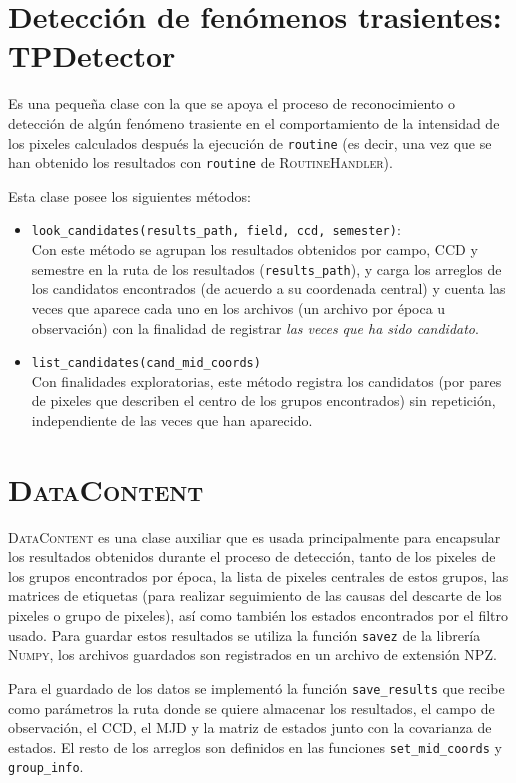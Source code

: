 \section{Detecci\'on de fen\'omenos trasientes: \textbf{TPDetector}}
Es una peque\~na clase con la que se apoya el proceso de reconocimiento o detecci\'on de alg\'un fen\'omeno trasiente en el comportamiento de la intensidad de los pixeles calculados despu\'es la ejecuci\'on de \texttt{routine} (es decir, una vez que se han obtenido los resultados con \texttt{routine} de \textsc{RoutineHandler}).
\bigskip

Esta clase posee los siguientes m\'etodos:

\begin{itemize}
\item \texttt{look\_candidates(results\_path, field, ccd, semester)}:\\
Con este m\'etodo se agrupan los resultados obtenidos por campo, CCD y semestre en la ruta de los resultados (\texttt{results\_path}), y carga los arreglos de los candidatos encontrados (de acuerdo a su coordenada central) y cuenta las veces que aparece cada uno en los archivos (un archivo por \'epoca u observaci\'on) con la finalidad de registrar \textit{las veces que ha sido candidato}.  
\bigskip

\item \texttt{list\_candidates(cand\_mid\_coords)}\\
Con finalidades exploratorias, este m\'etodo registra los candidatos (por pares de pixeles que describen el centro de los grupos encontrados) sin repetici\'on, independiente de las veces que han aparecido.
\end{itemize}

  
\section{\textsc{DataContent}}
\textsc{DataContent} es una clase auxiliar que es usada principalmente para encapsular los resultados obtenidos durante el proceso de detecci\'on, tanto de los pixeles de los grupos encontrados por \'epoca, la lista de pixeles centrales de estos grupos, las matrices de etiquetas (para realizar seguimiento de las causas del descarte de los pixeles o grupo de pixeles), as\'i como tambi\'en los estados encontrados por el filtro usado. Para guardar estos resultados se utiliza la funci\'on \texttt{savez} de la librer\'ia \textsc{Numpy}, los archivos guardados son registrados en un archivo de extensi\'on NPZ.
\bigskip

Para el guardado de los datos se implement\'o la funci\'on \texttt{save\_results} que recibe como par\'ametros la ruta donde se quiere almacenar los resultados, el campo de observaci\'on, el CCD, el MJD y la matriz de estados junto con la covarianza de estados. El resto de los arreglos son definidos en las funciones \texttt{set\_mid\_coords} y \texttt{group\_info}.